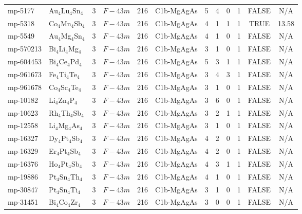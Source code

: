 {\begin{longtable}{llcccccccccc}
    mp-5177 & Au$_{4}$Lu$_{4}$Sn$_{4}$ & 3     & $F-43m$ & 216   & C1b-MgAgAs & 5     & 4     & 0     & 1     & FALSE & N/A \\
    mp-5318 & Co$_{4}$Mn$_{4}$Sb$_{4}$ & 3     & $F-43m$ & 216   & C1b-MgAgAs & 4     & 1     & 1     & 1     & TRUE  & 13.58  \\
    mp-5549 & Au$_{4}$Mg$_{4}$Sn$_{4}$ & 3     & $F-43m$ & 216   & C1b-MgAgAs & 4     & 1     & 0     & 1     & FALSE & N/A \\
    mp-570213 & Bi$_{4}$Li$_{4}$Mg$_{4}$ & 3     & $F-43m$ & 216   & C1b-MgAgAs & 3     & 1     & 0     & 1     & FALSE & N/A \\
    mp-604453 & Bi$_{4}$Ce$_{4}$Pd$_{4}$ & 3     & $F-43m$ & 216   & C1b-MgAgAs & 5     & 3     & 1     & 1     & FALSE & N/A \\
    mp-961673 & Fe$_{4}$Ti$_{4}$Te$_{4}$ & 3     & $F-43m$ & 216   & C1b-MgAgAs & 3     & 4     & 3     & 1     & FALSE & N/A \\
    mp-961678 & Co$_{4}$Sc$_{4}$Te$_{4}$ & 3     & $F-43m$ & 216   & C1b-MgAgAs & 3     & 1     & 0     & 1     & FALSE & N/A \\
    mp-10182 & Li$_{4}$Zn$_{4}$P$_{4}$ & 3     & $F-43m$ & 216   & C1b-MgAgAs & 3     & 6     & 0     & 1     & FALSE & N/A \\
    mp-10623 & Rh$_{4}$Th$_{4}$Sb$_{4}$ & 3     & $F-43m$ & 216   & C1b-MgAgAs & 3     & 2     & 1     & 1     & FALSE & N/A \\
    mp-12558 & Li$_{4}$Mg$_{4}$As$_{4}$ & 3     & $F-43m$ & 216   & C1b-MgAgAs & 3     & 1     & 0     & 1     & FALSE & N/A \\
    mp-16327 & Dy$_{4}$Pt$_{4}$Sb$_{4}$ & 3     & $F-43m$ & 216   & C1b-MgAgAs & 4     & 2     & 0     & 1     & FALSE & N/A \\
    mp-16329 & Er$_{4}$Pt$_{4}$Sb$_{4}$ & 3     & $F-43m$ & 216   & C1b-MgAgAs & 4     & 2     & 0     & 1     & FALSE & N/A \\
    mp-16376 & Ho$_{4}$Pt$_{4}$Sb$_{4}$ & 3     & $F-43m$ & 216   & C1b-MgAgAs & 4     & 3     & 1     & 1     & FALSE & N/A \\
    mp-19886 & Pt$_{4}$Sn$_{4}$Th$_{4}$ & 3     & $F-43m$ & 216   & C1b-MgAgAs & 4     & 1     & 0     & 1     & FALSE & N/A \\
    mp-30847 & Pt$_{4}$Sn$_{4}$Ti$_{4}$ & 3     & $F-43m$ & 216   & C1b-MgAgAs & 3     & 1     & 0     & 1     & FALSE & N/A \\
    mp-31451 & Bi$_{4}$Co$_{4}$Zr$_{4}$ & 3     & $F-43m$ & 216   & C1b-MgAgAs & 3     & 0     & 0     & 1     & FALSE & N/A \\

\end{longtable}}
